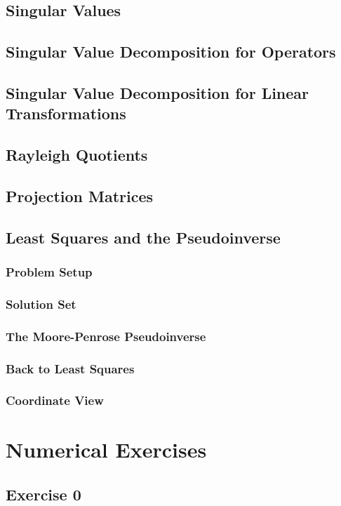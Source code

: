 \documentclass[10pt]{article}
\begin{document}
\subsection{Singular Values}
\subsection{Singular Value Decomposition for Operators}
\subsection{Singular Value Decomposition for Linear Transformations}
\subsection{Rayleigh Quotients}
\subsection{Projection Matrices}
\subsection{Least Squares and the Pseudoinverse}
\subsubsection{Problem Setup}
\subsubsection{Solution Set} 
\subsubsection{The Moore-Penrose Pseudoinverse}
\subsubsection{Back to Least Squares}
\subsubsection{Coordinate View}

\section{Numerical Exercises}
\subsection{Exercise 0}
\end{document}

